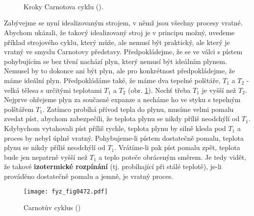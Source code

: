     \begin{figure}[hb!] %
      \centering
        \\
        \\
        \\
      \caption{Kroky Carnotova cyklu (\cite[s.~601]{Feynman01}).}
      \label{fyz:fig0471}
    \end{figure}

    Zabývejme se nyní idealizovaným strojem, v němž jsou všechny procesy vratné. Abychom ukázali, že
    takový idealizovaný stroj je v principu možný, uvedeme příklad strojového cyklu, který může, ale
    nemusí být praktický, ale který je vratný ve smyslu Carnotovy představy. Předpokládejme, že se
    ve válci s pístem pohybujícím se bez tření nachází plyn, který nemusí být ideálním plynem.
    Nemusel by to dokonce ani být plyn, ale pro konkrétnost předpokládejme, že máme ideální plyn.
    Předpokládáme také, že máme dva tepelné polštáře, \(T_1\) a \(T_2\) - velká tělesa s určitými
    teplotami \(T_1\) a \(T_2\) (obr. \ref{fyz:fig0471}). Nechť třeba \(T_1\) je vyšší než \(T_2\).
    Nejprve ohřejeme plyn za současné expanze a necháme ho ve styku s tepelným polštářem \(T_1\).
    Zatímco probíhá přívod tepla do plynu, musíme velmi pomalu zvedat píst, abychom zabezpečili, že
    teplota plynu se nikdy příliš neodchýlí od \(T_1\). Kdybychom vytahovali píst příliš rychle,
    teplota plynu by silně klesla pod \(T_1\) a proces by nebyl úplně vratný. Pohybujeme-li pístem
    dostatečně pomalu, teplota plynu se nikdy příliš neodchýlí od \(T_1\). Vrátíme-li pak píst
    pomalu zpět, teplota bude jen nepatrně vyšší než \(T_1\) a teplo poteče obráceným směrem. Je
    tedy vidět, že takové \textbf{izotermické rozpínání} (tj. probíhající při stálé teplotě), je-li
    prováděno dostatečně pomalu a jemně, je vratný proces.

    \begin{figure}[ht!] %
      \centering
      \texttt{[image: fyz\_fig0472.pdf]}
      \caption{Carnotův cyklus (\cite[s.~707]{Feynman01})}
      \label{fyz:fig0472}
    \end{figure}

